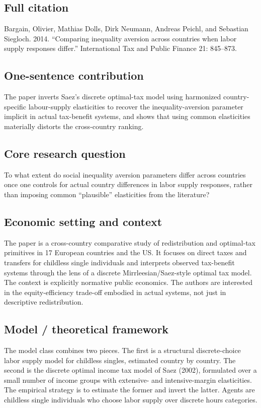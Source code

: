 \documentclass[11pt,a4paper]{article}
\begin{document}
\subsection*{Full citation}
Bargain, Olivier, Mathias Dolls, Dirk Neumann, Andreas Peichl, and Sebastian Siegloch. 2014. “Comparing inequality aversion across countries when labor supply responses differ.” International Tax and Public Finance 21: 845–873.

\subsection*{One-sentence contribution}
The paper inverts Saez's discrete optimal-tax model using harmonized country-specific labour-supply elasticities to recover the inequality-aversion parameter implicit in actual tax-benefit systems, and shows that using common elasticities materially distorts the cross-country ranking.

\subsection*{Core research question}
To what extent do social inequality aversion parameters differ across countries once one controls for actual country differences in labor supply responses, rather than imposing common “plausible” elasticities from the literature?

\subsection*{Economic setting and context}
The paper is a cross-country comparative study of redistribution and optimal-tax primitives in 17 European countries and the US. It focuses on direct taxes and transfers for childless single individuals and interprets observed tax-benefit systems through the lens of a discrete Mirrleesian/Saez-style optimal tax model. The context is explicitly normative public economics. The authors are interested in the equity-efficiency trade-off embodied in actual systems, not just in descriptive redistribution.

\subsection*{Model / theoretical framework}
The model class combines two pieces. The first is a structural discrete-choice labor supply model for childless singles, estimated country by country. The second is the discrete optimal income tax model of Saez (2002), formulated over a small number of income groups with extensive- and intensive-margin elasticities. The empirical strategy is to estimate the former and invert the latter. Agents are childless single individuals who choose labor supply over discrete hours categories.
\end{document}
